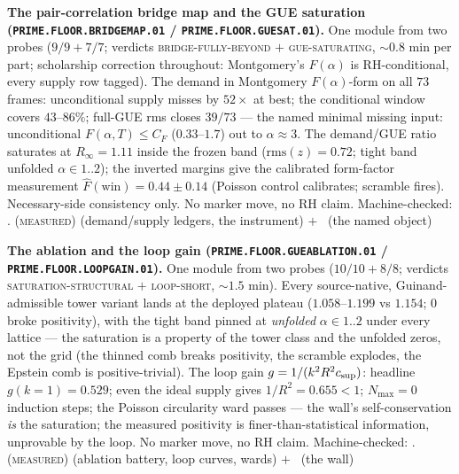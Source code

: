\par\smallskip\noindent\textbf{The pair-correlation bridge map and
the GUE saturation (\texttt{PRIME.FLOOR.BRIDGEMAP.01} /
\texttt{PRIME.FLOOR.GUESAT.01}).}
One module from two probes ($9/9 + 7/7$; verdicts
\textsc{bridge-fully-beyond} $+$ \textsc{gue-saturating},
$\sim0.8$ min per part; scholarship correction throughout:
Montgomery's $F(\alpha)$ is RH-conditional, every supply row
tagged).  The demand in Montgomery $F(\alpha)$-form on all $73$
frames: unconditional supply misses by $52\times$ at best; the
conditional window covers $43$--$86\%$; full-GUE rms closes
$39/73$ --- the named minimal missing input: unconditional
$F(\alpha, T) \le C_F$ ($0.33$--$1.7$) out to $\alpha \approx 3$.
The demand/GUE ratio saturates at $R_\infty = 1.11$ inside the
frozen band ($\mathrm{rms}(z) = 0.72$; tight band unfolded
$\alpha \in 1..2$); the inverted margins give the calibrated
form-factor measurement $\hat F(\mathrm{win}) = 0.44 \pm 0.14$
(Poisson control calibrates; scramble fires).  Necessary-side
consistency only.  No marker move, no RH claim.
Machine-checked: .
(\textsc{measured}) (demand/supply ledgers, the instrument) $+$
\mO\ (the named object)
\par\smallskip


\par\smallskip\noindent\textbf{The ablation and the loop gain
(\texttt{PRIME.FLOOR.GUEABLATION.01} /
\texttt{PRIME.FLOOR.LOOPGAIN.01}).}
One module from two probes ($10/10 + 8/8$; verdicts
\textsc{saturation-structural} $+$ \textsc{loop-short},
$\sim1.5$ min).  Every source-native, Guinand-admissible tower
variant lands at the deployed plateau ($1.058$--$1.199$ vs
$1.154$; $0$ broke positivity), with the tight band pinned at
\emph{unfolded} $\alpha \in 1..2$ under every lattice --- the
saturation is a property of the tower class and the unfolded
zeros, not the grid (the thinned comb breaks positivity, the
scramble explodes, the Epstein comb is positive-trivial).  The
loop gain $g = 1/(k^2R^2c_{\rm sup})$: headline
$g(k{=}1) = 0.529$; even the ideal supply gives $1/R^2 = 0.655 <
1$; $N_{\max} = 0$ induction steps; the Poisson circularity ward
passes --- the wall's self-conservation \emph{is} the saturation;
the measured positivity is finer-than-statistical information,
unprovable by the loop.  No marker move, no RH claim.
Machine-checked: .
(\textsc{measured}) (ablation battery, loop curves, wards) $+$
\mO\ (the wall)
\par\smallskip


